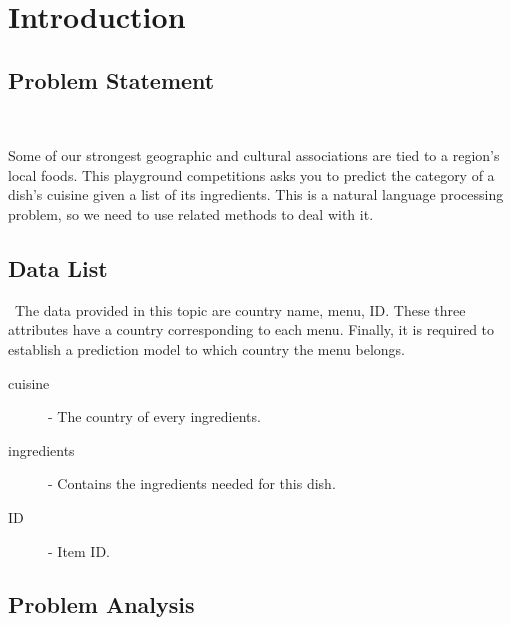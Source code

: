\section{Introduction}\label{sec-intro}





\subsection{Problem Statement}
\

Some of our strongest geographic and cultural associations are tied to a region's local foods. 
This playground competitions asks you to predict the category of a dish's cuisine given a list of its
ingredients. This is a natural language processing problem, so we need to use related methods to deal with it.
\subsection{Data List}
\
The data provided in this topic are country name, menu, ID. These three attributes have a country corresponding to each menu.
 Finally, it is required to establish a prediction model to which country the menu belongs.
\begin{description}
  \item [cuisine] - The country of every ingredients.
  \item [ingredients] - Contains the ingredients needed for this dish.
  \item [ID] - Item ID.
\end{description}

\subsection{Problem Analysis}
\

